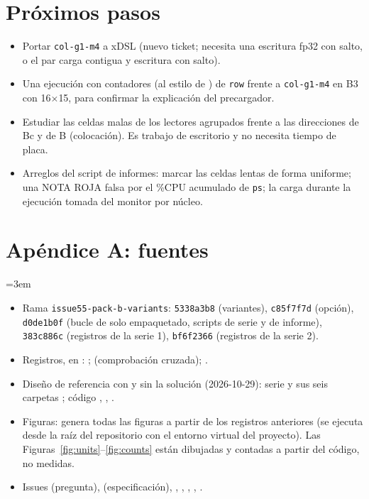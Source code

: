 \section{Próximos pasos}
\begin{itemize}
  \item Portar \texttt{col-g1-m4} a xDSL (nuevo ticket; necesita una escritura fp32 con salto, o el par carga contigua y escritura con
  salto).
  \item Una ejecución con contadores (al estilo de ) de \texttt{row} frente a \texttt{col-g1-m4} en B3 con 16$\times$15, para
  confirmar la explicación del precargador.
  \item Estudiar las celdas malas de los lectores agrupados frente a las direcciones de Bc y de B (colocación). Es trabajo de
  escritorio y no necesita tiempo de placa.
  \item Arreglos del script de informes: marcar las celdas lentas de forma uniforme; una NOTA ROJA falsa por el \%CPU acumulado de
  \texttt{ps}; la carga durante la ejecución tomada del monitor por núcleo.
\end{itemize}

\section*{Apéndice A: fuentes}
\raggedright\emergencystretch=3em
\begin{itemize}
  \item Rama \texttt{issue55-pack-b-variants}: \texttt{5338a3b8} (variantes), \texttt{c85f7f7d} (opción), \texttt{d0de1b0f} (bucle de
  solo empaquetado, scripts de serie y de informe), \texttt{383c886c} (registros de la serie 1), \texttt{bf6f2366} (registros de la
  serie 2).
  \item Registros, en : ;
   (comprobación cruzada);
  .
  \item Diseño de referencia con y sin la solución (2026-10-29): serie  y sus seis carpetas
  ; código , ,
  .
  \item Figuras:  genera todas las figuras a partir de los registros anteriores (se
  ejecuta desde la raíz del repositorio con el entorno virtual del proyecto). Las Figuras~\ref{fig:units}--\ref{fig:counts} están
  dibujadas y contadas a partir del código, no medidas.
  \item Issues  (pregunta),  (especificación), , , , , .
\end{itemize}

